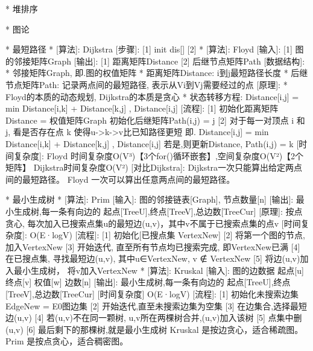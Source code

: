         * 堆排序

    * 图论

        * 最短路径
        * [算法]: Dijkstra
                [步骤]:
                    [1] init dis[]
                    [2]  
        * [算法]: Floyd
                [输入]:	[1] 图的邻接矩阵Graph
                [输出]: [1] 距离矩阵Distance	[2] 后继节点矩阵Path
                [数据结构]:
                    * 邻接矩阵Graph, 即.图的权值矩阵
                    * 距离矩阵Distance: i到j最短路径长度
                    * 后继节点矩阵Path: 记录两点间的最短路径, 表示从Vi到Vj需要经过的点
                [原理]:
                    * Floyd的本质的动态规划, Dijkstra的本质是贪心
                    * 状态转移方程:
                        Distance[i,j] = min{ Distance[i,k] + Distance[k,j] , Distance[i,j] }
                [流程]:
                    [1] 初始化距离矩阵Distance = 权值矩阵Graph
                        初始化后继矩阵Path(i,j) = j
                    [2] 对于每一对顶点 i 和 j, 看是否存在点 k 使得u->k->v比已知路径更短
                            即. Distance[i,j] = min{ Distance[i,k] + Distance[k,j] , Distance[i,j] }
                        若是,则更新Distance, Path(i,j) = k
                [时间复杂度]:
                    Floyd	时间复杂度O(V³)【3个for()循环嵌套】,空间复杂度O(V²)【2个矩阵】
                    Dijkstra时间复杂度O(V²)
                [对比Dijkstra]:
                    Dijkstra一次只能算出给定两点间的最短路径。
                    Floyd   一次可以算出任意两点间的最短路径。

        * 最小生成树
        * [算法]: Prim
                [输入]: 图的邻接链表[Graph], 节点数量[n]
                [输出]: 最小生成树,每一条有向边的 起点[TreeU],终点[TreeV],总边数[TreeCur]
                [原理]: 按点贪心, 每次加入已搜索点集u的最短边(u,v)，其中v不属于已搜索点集的点v
                [时间复杂度]: O(E·logV)
                [流程]:
                    [1] 初始化[已搜点集 VertexNew]
                    [2] 将第一个图的节点, 加入VertexNew
                    [3] 开始迭代, 直至所有节点均已搜索完成, 即VertexNew已满
                        [4] 在已搜点集, 寻找最短边(u,v), 其中u∈VertexNew, v ∉ VertexNew
                        [5] 将边(u,v)加入最小生成树， 将v加入VertexNew
        * [算法]: Kruskal
                [输入]: 图的边数据 起点[u] 终点[v] 权值[w] 边数[n]
                [输出]: 最小生成树,每一条有向边的 起点[TreeU],终点[TreeV],总边数[TreeCur]
                [时间复杂度] O(E·logV)
                [流程]:
                    [1] 初始化未搜索边集EdgeNew = E0图边集
                    [2] 开始迭代,直至未搜索边集为空集
                        [3] 在边集合,选择最短边(u,v)
                        [4] 若(u,v)不在同一颗树, u,v所在两棵树合并,(u,v)加入该树
                        [5] 点集中删(u,v)
                    [6] 最后剩下的那棵树,就是最小生成树
                Kruskal	是按边贪心，适合稀疏图。
                Prim	是按点贪心，适合稠密图。

